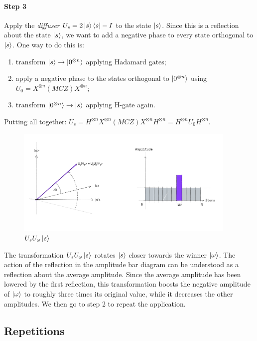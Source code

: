 \documentclass{article}
\begin{document}
\paragraph{Step 3}
Apply the \emph{diffuser} $U_s = 2\ket{s}\bra{s} -I$ to the state $\ket{s}$.
Since this is a reflection about the state $\ket{s}$, we want to add a negative
phase to every state orthogonal to $\ket{s}$.
One way to do this is:
\begin{enumerate}
  \item
  transform $\ket{s} \rightarrow \ket{0^{\otimes n}}$ applying Hadamard gates;
  \item
  apply a negative phase to the states orthogonal to $\ket{0^{\otimes n}}$ using
  $
    U_0 = X^{\otimes n} (MCZ) X^{\otimes n};
  $
  \item
  transform $\ket{0^{\otimes n}} \rightarrow \ket{s}$ applying H-gate again.
\end{enumerate}
Putting all together: $U_s = H^{\otimes n} X^{\otimes n} (MCZ) X^{\otimes n}
H^{\otimes n} = H^{\otimes n} U_0 H^{\otimes n}$.
\begin{figure}[H]
  \centering
  \includegraphics[width=300pt]{Img/grover-step3.jpg}
  \caption{$U_s U_\omega \ket{s}$}
\end{figure}
The transformation $U_s U_\omega \ket{s}$ rotates $\ket{s}$
closer towards the winner $\ket{\omega}$.
The action of the reflection
in the amplitude bar diagram can be understood as a reflection about the
average amplitude. Since the average amplitude has been lowered by the first
reflection, this transformation boosts the negative amplitude of
$\ket{\omega}$ to roughly three times its original value, while it decreases
the other amplitudes. We then go to step 2 to repeat the application.

\subsection{Repetitions}
\end{document}
